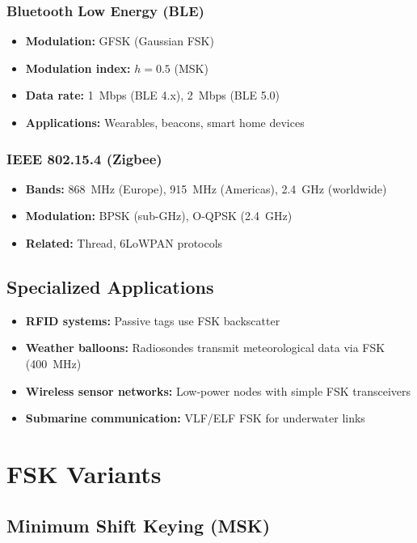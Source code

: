 \subsubsection{Bluetooth Low Energy (BLE)}

\begin{itemize}
\item \textbf{Modulation:} GFSK (Gaussian FSK)
\item \textbf{Modulation index:} $h = 0.5$ (MSK)
\item \textbf{Data rate:} 1~Mbps (BLE 4.x), 2~Mbps (BLE 5.0)
\item \textbf{Applications:} Wearables, beacons, smart home devices
\end{itemize}

\subsubsection{IEEE 802.15.4 (Zigbee)}

\begin{itemize}
\item \textbf{Bands:} 868~MHz (Europe), 915~MHz (Americas), 2.4~GHz (worldwide)
\item \textbf{Modulation:} BPSK (sub-GHz), O-QPSK (2.4~GHz)
\item \textbf{Related:} Thread, 6LoWPAN protocols
\end{itemize}

\subsection{Specialized Applications}

\begin{itemize}
\item \textbf{RFID systems:} Passive tags use FSK backscatter
\item \textbf{Weather balloons:} Radiosondes transmit meteorological data via FSK (400~MHz)
\item \textbf{Wireless sensor networks:} Low-power nodes with simple FSK trans\-ceiv\-ers
\item \textbf{Submarine communication:} VLF/ELF FSK for underwater links
\end{itemize}

\section{FSK Variants}

\subsection{Minimum Shift Keying (MSK)}

